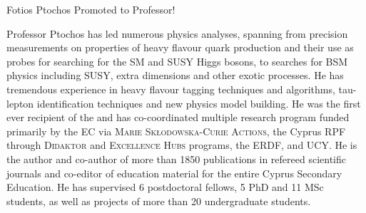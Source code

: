 \begin{headline}[enhanced, tikz={rotate=0}, width=0.5\textwidth]{Fotios Ptochos Promoted to Professor!}
\begin{multicols}{2}
    Professor Ptochos has led numerous physics analyses, spanning
    from precision measurements on properties of heavy flavour quark
    production and their use as probes for searching for the SM and SUSY
    Higgs bosons, to searches for BSM physics including SUSY, extra
    dimensions and other exotic processes. He has tremendous experience in
    heavy flavour tagging techniques and algorithms, tau-lepton
    identification techniques and new physics model building. 
    He was the first ever recipient of the  and has co-coordinated multiple research program
    funded primarily by the EC via \textsc{Marie
    Skłodowska-Curie Actions}, the Cyprus RPF through
    \textsc{Didaktor} and \textsc{Excellence Hubs} programs, the ERDF,
    and UCY. He is the author and co-author of more than 
    1850 publications in refereed scientific journals and co-editor of
    education material for the entire Cyprus Secondary Education. He has
    supervised 6 postdoctoral fellows, 5
    PhD and 11 MSc students, as well as projects of more than 20
    undergraduate students.  
\end{multicols}
\end{headline}

